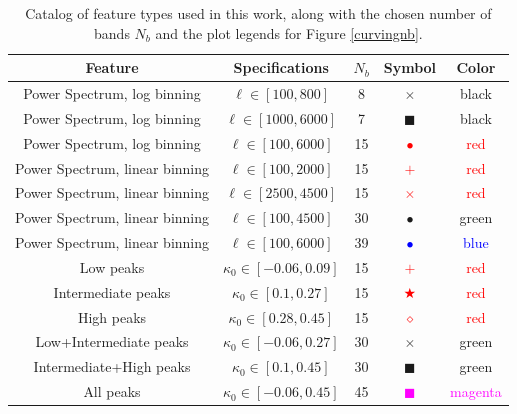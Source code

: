 \documentclass[reprint,aps,prd,superscriptaddress,showkeys,showpacs]{revtex4-1}
\begin{document}
\begin{table}
\begin{center}
\begin{tabular}{ccccc}
\toprule
\textbf{Feature} &  \textbf{Specifications} & $N_b$ &  \textbf{Symbol} & \textbf{Color} \\ \hline \hline
\midrule
Power Spectrum, log binning  & $\ell \in [100,800] $ & 8 & $\times$ & black  \\ 
Power Spectrum, log binning  & $\ell \in [1000,6000] $ & 7 & $\blacksquare$ & black  \\ 
Power Spectrum, log binning  & $\ell \in [100,6000] $ & 15 & \textcolor{red}{$\bullet$} & \textcolor{red}{red}  \\
Power Spectrum, linear binning  & $\ell \in [100,2000] $ & 15 & \textcolor{red}{$+$} & \textcolor{red}{red}  \\ 
Power Spectrum, linear binning  & $\ell \in [2500,4500] $ & 15 & \textcolor{red}{$\times$} & \textcolor{red}{red}  \\
Power Spectrum, linear binning  & $\ell \in [100,4500] $ & 30 & \textcolor{OliveGreen}{$\bullet$} & \textcolor{OliveGreen}{green}  \\ 
Power Spectrum, linear binning  & $\ell \in [100,6000] $ & 39 & \textcolor{blue}{$\bullet$} & \textcolor{blue}{blue}  \\ \hline
Low peaks  & $\kappa_0 \in [-0.06,0.09] $ & 15 & \textcolor{red}{$+$} & \textcolor{red}{red}  \\ 
Intermediate peaks  & $\kappa_0 \in [0.1,0.27] $ & 15 & \textcolor{red}{$\bigstar$} & \textcolor{red}{red}  \\ 
High peaks  & $\kappa_0 \in [0.28,0.45] $ & 15 & \textcolor{red}{$\diamond$} & \textcolor{red}{red}  \\
Low+Intermediate peaks  & $\kappa_0 \in [-0.06,0.27] $ & 30 & \textcolor{OliveGreen}{$\times$} & \textcolor{OliveGreen}{green}  \\
Intermediate+High peaks  & $\kappa_0 \in [0.1,0.45] $ & 30 & \textcolor{OliveGreen}{$\blacksquare$} & \textcolor{OliveGreen}{green}  \\
All peaks  & $\kappa_0 \in [-0.06,0.45] $ & 45 & \textcolor{magenta}{$\blacksquare$} & \textcolor{magenta}{magenta}  \\ \hline
\bottomrule
\end{tabular}
\end{center}
\caption{Catalog of feature types used in this work, along with the
  chosen number of bands $N_b$ and the plot legends for Figure
  \ref{curvingnb}.}
\label{featuretable}
\end{table}
\end{document}
